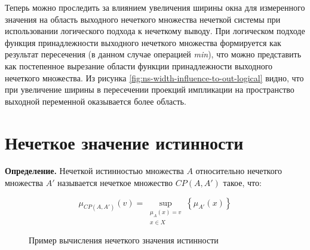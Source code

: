 Теперь можно проследить за влиянием увеличения ширины окна для измеренного значения на область выходного нечеткого множества нечеткой системы при использовании логического подхода к нечеткому выводу. При логическом подходе функция принадлежности выходного нечеткого множества формируется как результат пересечения (в данном случае операцией \textit{min}), что можно представить как постепенное вырезание области функции принадлежности выходного нечеткого множества. Из рисунка \cref{fig:ns-width-influence-to-out-logical} видно, что при увеличение ширины в пересечении проекций импликации на пространство выходной переменной оказывается более \frqq область.


\section{Нечеткое значение истинности}

\textbf{Определение.} Нечеткой истинностью множества $A$ относительно нечеткого множества $A'$ называется нечеткое множество $CP(A,A')$ такое, что:

\begin{equation}
\label{eqn:1-ftv}
\mu_{CP(A, A')}(v) = \sup_{\substack{\mu_{A}(x) = v \\ x \in X}}\left\{\mu_{A'}(x)\right\}
\end{equation}

\begin{figure}[ht]
	\centering
	\caption{Пример вычисления нечеткого значения истинности}
	\label{fig:ftv-computation}
\end{figure}

